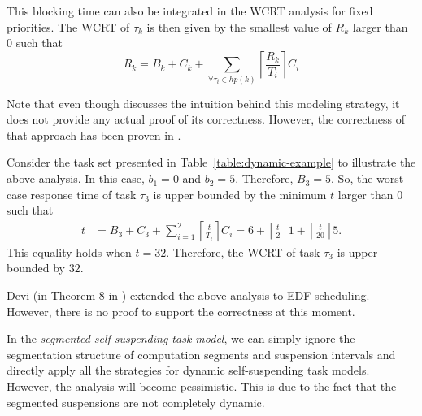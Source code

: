 This blocking time can also be integrated in the WCRT analysis for fixed priorities. The WCRT of $\tau_k$ is then given by the smallest value of $R_k$ larger than $0$ such that
\begin{equation*}
R_k = B_k + C_k + \sum_{\forall \tau_i \in hp(k)} \left\lceil \frac{R_k}{T_i} \right\rceil C_i
\end{equation*}


Note that even though \cite{Liu:2000:RS:518501} discusses the intuition behind this modeling strategy, it does not provide any actual proof of its correctness. 
However, the correctness of that approach has been proven in \cite{ChenHuangNelissen}. 

\begin{example}
\label{ex:suspension-blocking}    
Consider the task set presented in Table~\ref{table:dynamic-example} to illustrate the above analysis. In this case, $b_1 = 0$ and $b_2 = 5$. Therefore, $B_3 = 5$. So, the worst-case response time of task $\tau_3$ is upper bounded by the minimum $t$ larger than $0$ such that 
\begin{align*}
t & = B_3+C_3+\sum_{i=1}^2 \left\lceil \frac{t}{T_i} \right\rceil C_i = 6+\left\lceil \frac{t}{2} \right\rceil 1 +\left\lceil \frac{t}{20} \right\rceil 5.
\end{align*} 
This equality holds when $t=32$. Therefore, the WCRT of task $\tau_{3}$ is upper bounded by $32$.
\hfill\myendproof  
\end{example}



Devi (in Theorem 8 in \cite[Section 4.5]{DBLP:conf/ecrts/Devi03}) extended the above analysis to
EDF scheduling. However, there is no proof to support the correctness at this moment.



\label{sec:model-interfering-improving}

In the \emph{segmented self-suspending task model}, we can simply ignore the segmentation structure of computation segments and suspension intervals 
and directly apply all the strategies for dynamic self-suspending task models. However, the analysis will become pessimistic. This is due to the fact 
that the segmented suspensions are not completely dynamic. 


